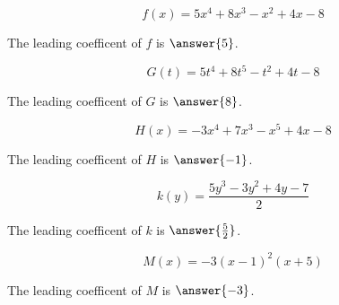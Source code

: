 \documentclass{ximera}
\author{Lee Wayand}
\begin{document}
\begin{exercise}








\begin{question}


\[
f(x) = 5x^4 + 8x^3 - x^2 + 4x - 8
\]


The leading coefficent of $f$ is $\answer{5}$.

\end{question}







\begin{question}


\[
G(t) = 5t^4 + 8t^5 - t^2 + 4t - 8
\]


The leading coefficent of $G$ is $\answer{8}$.

\end{question}











\begin{question}


\[
H(x) = -3x^4 + 7x^3 - x^5 + 4x - 8
\]


The leading coefficent of $H$ is $\answer{-1}$.

\end{question}








\begin{question}


\[
k(y) = \frac{5y^3 - 3y^2 + 4y - 7}{2}
\]


The leading coefficent of $k$ is $\answer{\frac{5}{2}}$.

\end{question}










\begin{question}


\[
M(x) = -3(x-1)^2(x+5)
\]


The leading coefficent of $M$ is $\answer{-3}$.

\end{question}












\end{exercise}
\end{document}
